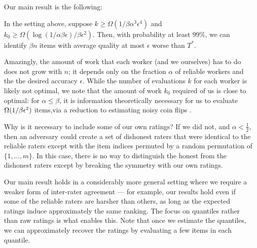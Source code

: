 Our main result is the following:



\begin{theorem}
\label{thm:intro}
In the setting above, suppose 
$k \geq \Omega(1/\beta\alpha^3\epsilon^4)$ and 
$k_0 \geq \Omega(\log(1/\alpha\beta\epsilon)/\beta\epsilon^2)$. Then, with probability 
at least $99\%$, we can identify $\beta n$ items with average quality at most 
$\epsilon$ worse than $T^*$.
\end{theorem}
Amazingly, the amount of work that each worker (and we ourselves) has 
to do does not grow with $n$; it depends only on the fraction $\alpha$ of 
reliable workers and the the desired accuracy $\epsilon$.   While the number 
of evaluations $k$ for each worker is likely not optimal, we note that 
the amount of work $k_0$ required of us is close to optimal: 
for $\alpha \le \beta$, it is information theoretically necessary for us to evaluate $\Omega(1/\beta\epsilon^2)$ items,via a reduction to estimating 
noisy coin flips \citep{mannor2004sample}.

Why is it necessary to include some of our own ratings? 
If we did not, and $\alpha < \frac{1}{2}$, then an adversary could create a set of 
dishonest raters that were identical to the reliable raters except with the 
item indices permuted by a random permutation of $\{1,\ldots,m\}$. In this case, 
there is no way to distinguish the honest from the dishonest raters except by 
breaking the symmetry with our own ratings.

Our main result holds in a considerably more general setting where we require a weaker form of inter-rater agreement --- for example, our results hold even if some of the reliable raters are harsher than others, as long as 
the expected ratings induce approximately the same ranking.
The focus on quantiles rather than raw ratings is what enables this. 
Note that once we estimate the quantiles, we can approximately recover the 
ratings by evaluating a few items in each quantile.

